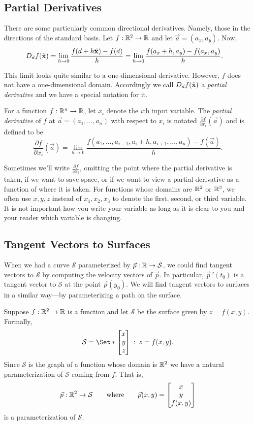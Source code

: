\subsection{Partial Derivatives}
There are some particularly common directional derivatives.  Namely, those in the directions
of the standard basis.  Let $f:\mathbb{R}^2\to\mathbb{R}$ and let $\vec a=(a_x,a_y)$.  Now,
\begin{align*}
	D_{\vec a}f({\hat {\mathbf x}}) &= \lim_{h\to0}\frac{f(\vec a+h{\hat {\mathbf x}})-f(\vec a)}{h}
	=\lim_{h\to0}\frac{f(a_x+h, a_y)-f(a_x,a_y)}{h}.
\end{align*}

This limit looks quite similar to a one-dimensional derivative.  However, $f$ does not
have a one-dimensional domain.  Accordingly we call $D_{\vec a}f({\hat {\mathbf x}})$ a 
\emph{partial derivative} and we have a special notation for it.

\begin{definition}
	For a function $f:\mathbb{R}^n\to\mathbb{R}$, let $x_i$ denote the $i$th input variable.
	The \emph{partial derivative} of $f$ at $\vec a=(a_1,\ldots,a_n)$ with respect to $x_i$ is 
	notated $\frac{\partial f}{\partial x_i}(\vec a)$ and is defined to be
	\[
		\frac{\partial f}{\partial x_i}(\vec a) = 
		\lim_{h\to0}\frac{f(a_1,\ldots,a_{i-1},a_i+h,a_{i+1},\ldots,a_n)-f(\vec a)}{h}.
	\]
\end{definition}
Sometimes we'll write $\frac{\partial f}{\partial x_i}$, omitting the point where the partial
derivative is taken, if we want to save space, or if we want to view a partial derivative as a function
of where it is taken.  For functions whose domains are $\mathbb{R}^2$ or $\mathbb{R}^3$, we often use $x,y,z$ 
instead of $x_1,x_2,x_3$ to denote
the first, second, or third variable.  It is not important how you write your variable as long
as it is clear to you and your reader which variable is changing.

\subsection{Tangent Vectors to Surfaces}
When we had a curve $\mathcal S$ parameterized by $\vec p:\mathbb{R}\to\mathcal S$,
we could find tangent vectors to $\mathcal S$ by computing the velocity vectors of $\vec p$.
In particular, $\vec p\,'(t_0)$ is a tangent vector to $\mathcal S$ at the point $\vec p(y_0)$.
We will find tangent vectors to surfaces in a similar way---by parameterizing a path on the surface.

Suppose $f:\mathbb{R}^2\to \mathbb{R}$ is a function and let $\mathcal S$ be the surface given by $z=f(x,y)$.  Formally,
\[
	\mathcal S=\Set*{\mat{x\\y\\z}\given z=f(x,y)}.
\]
Since $\mathcal S$ is the graph of a function whose domain is $\mathbb{R}^2$ we have a natural parameterization
of $\mathcal S$ coming from $f$.  That is,
\[
	\vec p:\mathbb{R}^2\to\mathcal S\qquad\text{where}\qquad \vec p(x,y)=\begin{bmatrix}x\\y\\f(x,y)\end{bmatrix}
\]
is a parameterization of $\mathcal S$.


